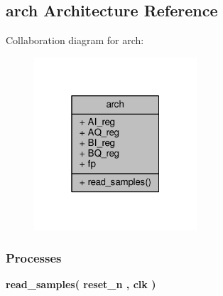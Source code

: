 \subsection{arch Architecture Reference}
\label{classdac__data__sim_1_1arch}


Collaboration diagram for arch\+:\nopagebreak
\begin{figure}[H]
\begin{center}
\leavevmode
\includegraphics[width=172pt]{d0/d26/classdac__data__sim_1_1arch__coll__graph}
\end{center}
\end{figure}
\subsubsection*{Processes}
 \begin{DoxyCompactItemize}
\item 
{\bf read\+\_\+samples}{\bfseries  ( {\bfseries {\bfseries {\bf reset\+\_\+n}} \textcolor{vhdlchar}{ }} , {\bfseries {\bfseries {\bf clk}} \textcolor{vhdlchar}{ }} )}
\end{DoxyCompactItemize}
